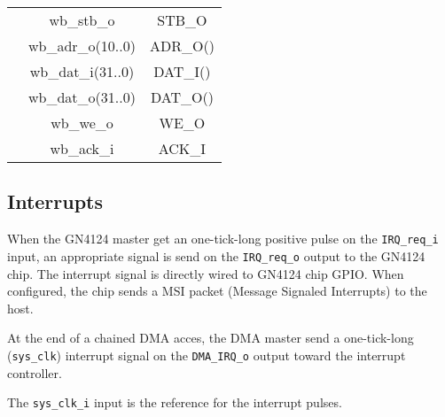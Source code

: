 \documentclass[10pt,a4paper]{cerndoc}
\begin{document}
\begin{tabularx}{\textwidth}{|X|cc|}
      &  wb\_stb\_o        &  STB\_O                                                                           \\
      &  wb\_adr\_o(10..0) &  ADR\_O()                                                                         \\
      &  wb\_dat\_i(31..0) &  DAT\_I()                                                                         \\
      &  wb\_dat\_o(31..0) &  DAT\_O()                                                                         \\
      &  wb\_we\_o         &  WE\_O                                                                            \\
      &  wb\_ack\_i        &  ACK\_I                                                                           \\ \hline
	\end{tabularx}

   \subsection{Interrupts}
   When the GN4124 master get an one-tick-long positive pulse on the \verb+IRQ_req_i+ input, an appropriate signal is send on the \verb+IRQ_req_o+ output to the GN4124 chip. The interrupt signal is directly wired to GN4124 chip GPIO. When configured, the chip sends a MSI packet (Message Signaled Interrupts) to the host.
   
   At the end of a chained DMA acces, the DMA master send a one-tick-long (\verb+sys_clk+) interrupt signal on the \verb+DMA_IRQ_o+ output toward the interrupt controller.
   
   The \verb+sys_clk_i+ input is the reference for the interrupt pulses.
   
\end{document}
